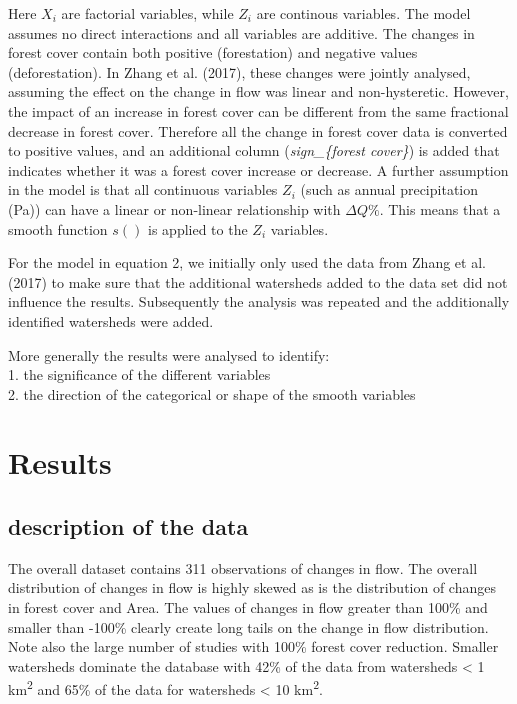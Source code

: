 \documentclass[]{elsarticle} %
\begin{document}
Here \(X_i\) are factorial variables, while \(Z_i\) are continous
variables. The model assumes no direct interactions and all variables
are additive. The changes in forest cover contain both positive
(forestation) and negative values (deforestation). In Zhang et al.
(2017), these changes were jointly analysed, assuming the effect on the
change in flow was linear and non-hysteretic. However, the impact of an
increase in forest cover can be different from the same fractional
decrease in forest cover. Therefore all the change in forest cover data
is converted to positive values, and an additional column
(\emph{sign\_\{forest cover\}}) is added that indicates whether it was a
forest cover increase or decrease. A further assumption in the model is
that all continuous variables \(Z_i\) (such as annual precipitation
(Pa)) can have a linear or non-linear relationship with \(\Delta Q \%\).
This means that a smooth function \(s()\) is applied to the \(Z_i\)
variables.

For the model in equation 2, we initially only used the data from Zhang
et al. (2017) to make sure that the additional watersheds added to the
data set did not influence the results. Subsequently the analysis was
repeated and the additionally identified watersheds were added.

More generally the results were analysed to identify:\\
1. the significance of the different variables\\
2. the direction of the categorical or shape of the smooth variables

\hypertarget{results}{%
\section{Results}\label{results}}

\hypertarget{description-of-the-data}{%
\subsection{description of the data}\label{description-of-the-data}}

The overall dataset contains 311 observations of changes in flow. The
overall distribution of changes in flow is highly skewed as is the
distribution of changes in forest cover and Area. The values of changes
in flow greater than 100\% and smaller than -100\% clearly create long
tails on the change in flow distribution. Note also the large number of
studies with 100\% forest cover reduction. Smaller watersheds dominate
the database with 42\% of the data from watersheds \textless{} 1
km\textsuperscript{2} and 65\% of the data for watersheds \textless{} 10
km\textsuperscript{2}.
\end{document}
